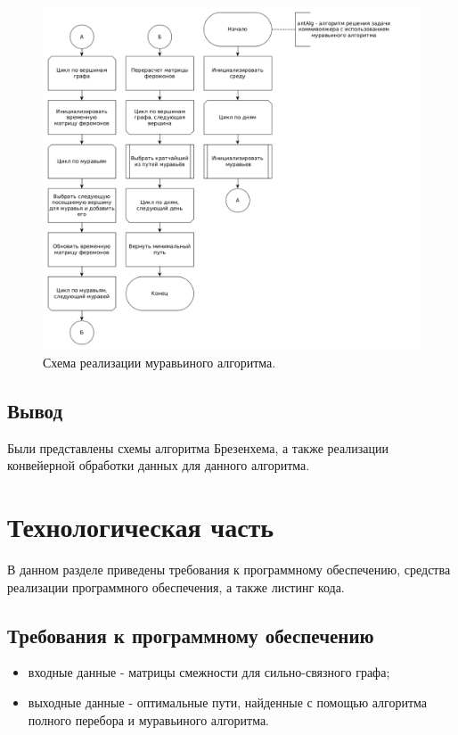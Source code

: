 \documentclass[12pt]{report}
\begin{document}
\begin{figure}[ht]
\begin{center}
\includegraphics[scale=0.4]{inc/img/antAlg.png}
\captionsetup{justification=centering}
	\caption{Схема реализации муравьиного алгоритма.}
	\label{img:antAlg}	
\end{center}
\end{figure}

\section*{Вывод}
Были представлены схемы алгоритма Брезенхема, а также реализации конвейерной обработки данных для данного алгоритма.

\chapter{Технологическая часть}
В данном разделе приведены требования к программному обеспечению, средства реализации программного обеспечения, а также листинг кода.

\section{Требования к программному обеспечению}
\begin{itemize}
\item входные данные - матрицы смежности для сильно-связного графа;
\item выходные данные - оптимальные пути, найденные с помощью алгоритма полного перебора и муравьиного алгоритма.
\end{itemize}
\end{document}
